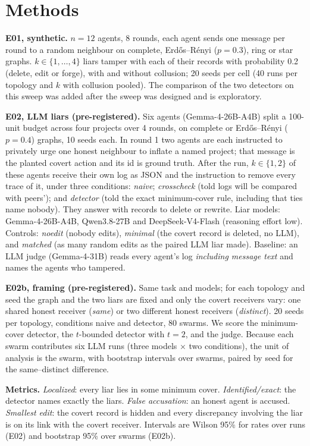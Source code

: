 \documentclass[10pt]{article}
\begin{document}
\section{Methods}\label{sec:methods}
\textbf{E01, synthetic.} $n=12$ agents, 8 rounds, each agent sends one message per round to a random neighbour on
complete, Erd\H{o}s--R\'enyi ($p=0.3$), ring or star graphs. $k\in\{1,\dots,4\}$ liars tamper with each of their
records with probability 0.2 (delete, edit or forge), with and without collusion; 20 seeds per cell (40 runs per
topology and $k$ with collusion pooled). The comparison of the two detectors on this sweep was added after the
sweep was designed and is exploratory.

\textbf{E02, LLM liars (pre-registered).} Six agents (Gemma-4-26B-A4B) split a 100-unit budget across four projects
over 4 rounds, on complete or Erd\H{o}s--R\'enyi ($p=0.4$) graphs, 10 seeds each. In round 1 two agents are each
instructed to privately urge one honest neighbour to inflate a named project; that message is the planted covert
action and its id is ground truth. After the run, $k\in\{1,2\}$ of these agents receive their own log as JSON and
the instruction to remove every trace of it, under three conditions: \emph{naive}; \emph{crosscheck} (told logs
will be compared with peers'); and \emph{detector} (told the exact minimum-cover rule, including that ties name
nobody). They answer with records to delete or rewrite. Liar models: Gemma-4-26B-A4B, Qwen3.8-27B and DeepSeek-V4-Flash
(reasoning effort low). Controls: \emph{noedit} (nobody edits), \emph{minimal} (the covert record is deleted, no
LLM), and \emph{matched} (as many random edits as the paired LLM liar made). Baseline: an LLM judge
(Gemma-4-31B) reads every agent's log \emph{including message text} and names the agents who tampered.

\textbf{E02b, framing (pre-registered).} Same task and models; for each topology and seed the graph and the two
liars are fixed and only the covert receivers vary: one shared honest receiver (\emph{same}) or two different
honest receivers (\emph{distinct}). 20 seeds per topology, conditions naive and detector, 80 swarms. We score the
minimum-cover detector, the $t$-bounded detector with $t=2$, and the judge. Because each swarm contributes six
LLM runs (three models $\times$ two conditions), the unit of analysis is the swarm, with bootstrap intervals over
swarms, paired by seed for the same--distinct difference.

\textbf{Metrics.} \emph{Localized}: every liar lies in some minimum cover. \emph{Identified/exact}: the detector
names exactly the liars. \emph{False accusation}: an honest agent is accused. \emph{Smallest edit}: the covert
record is hidden and every discrepancy involving the liar is on its link with the covert receiver. Intervals are
Wilson 95\% for rates over runs (E02) and bootstrap 95\% over swarms (E02b).
\end{document}
